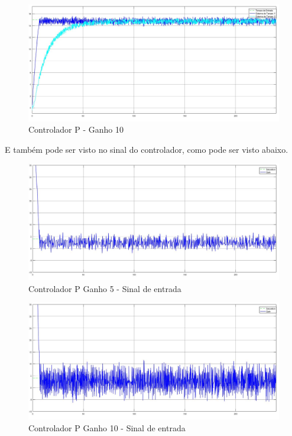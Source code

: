 \documentclass[
	12pt,				%
	openany,			%
	oneside,			%
	a4paper,			%
	english,			%
	french,				%
	spanish,			%
	brazil,				%
	]{abntex2}
\begin{document}
{\begin{figure}[h]
	\centering
	\includegraphics[scale=0.30]{controlador_p_ganho_10.jpg}
	\caption{Controlador P - Ganho 10}
\end{figure}

E também pode ser visto no sinal do controlador, como pode ser visto abaixo.

\begin{figure}[h]
	\centering
	\includegraphics[scale=0.33]{osciloscopio_ganho_5.jpg}
	\caption{Controlador P Ganho 5 - Sinal de entrada}
	\label{fig:controladorPG5}
\end{figure}

\begin{figure}[h]
	\centering
	\includegraphics[scale=0.33]{osciloscopio_ganho_10.jpg}
	\caption{Controlador P Ganho 10 - Sinal de entrada}
	\label{fig:controladorPG10}
\end{figure}

}
\end{document}
